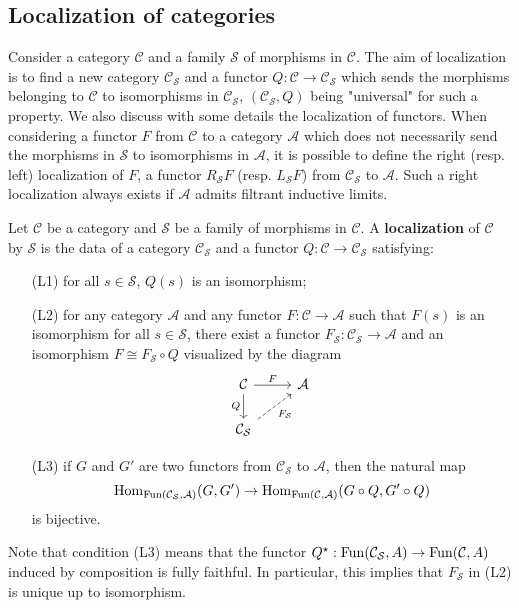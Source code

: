 \subsection{Localization of categories}
Consider a category $\mathcal{C}$ and a family $\mathcal{S}$ of morphisms in $\mathcal{C}$. The aim of localization is to find a new category $\mathcal{C}_\mathcal{S}$ and a functor $Q:\mathcal{C}\to\mathcal{C}_\mathcal{S}$ which sends the morphisms belonging to $\mathcal{C}$ to isomorphisms in $\mathcal{C}_\mathcal{S}$, $(\mathcal{C}_\mathcal{S},Q)$ being "universal" for such a property. We also discuss with some details the localization of functors. When considering a functor $F$ from $\mathcal{C}$ to a category $\mathcal{A}$ which does not necessarily send the morphisms in $\mathcal{S}$ to isomorphisms in $\mathcal{A}$, it is possible to define the right (resp. left) localization of $F$, a functor $R_\mathcal{S}F$ (resp. $L_\mathcal{S}F$) from $\mathcal{C}_\mathcal{S}$ to $\mathcal{A}$. Such a right localization always exists if $\mathcal{A}$ admits filtrant inductive limits.\par
Let $\mathcal{C}$ be a category and $\mathcal{S}$ be a family of morphisms in $\mathcal{C}$. A \textbf{localization} of $\mathcal{C}$ by $\mathcal{S}$ is the data of a category $\mathcal{C}_\mathcal{S}$ and a functor $Q:\mathcal{C}\to\mathcal{C}_\mathcal{S}$ satisfying:
\begin{enumerate}[leftmargin=40pt]
    \item[(L1)] for all $s\in\mathcal{S}$, $Q(s)$ is an isomorphism;
    \item[(L2)] for any category $\mathcal{A}$ and any functor $F:\mathcal{C}\to\mathcal{A}$ such that $F(s)$ is an isomorphism for all $s\in\mathcal{S}$, there exist a functor $F_\mathcal{S}:\mathcal{C}_\mathcal{S}\to\mathcal{A}$ and an isomorphism $F\cong F_\mathcal{S}\circ Q$ visualized by the diagram
    \[\begin{tikzcd}
    \mathcal{C}\ar[r,"F"]\ar[d,swap,"Q"]&\mathcal{A}\\ 
    \mathcal{C}_\mathcal{S}\ar[ru,dashed,swap,"F_\mathcal{S}"]
    \end{tikzcd}\]
    \item[(L3)] if $G$ and $G'$ are two functors from $\mathcal{C}_\mathcal{S}$ to $\mathcal{A}$, then the natural map
    \begin{equation}\label{category localization def-1}
    \mathrm{Hom}_{\mathrm{Fun}(\mathcal{C}_\mathcal{S},\mathcal{A})}(G,G')\to\mathrm{Hom}_{\mathrm{Fun}(\mathcal{C},\mathcal{A})}(G\circ Q,G'\circ Q)
    \end{equation}
    is bijective.
\end{enumerate}
Note that condition (L3) means that the functor $Q^\star:\mathrm{Fun}(\mathcal{C}_\mathcal{S},A)\to\mathrm{Fun}(\mathcal{C},A)$ induced by composition is fully faithful. In particular, this implies that $F_\mathcal{S}$ in (L2) is unique up to isomorphism.


